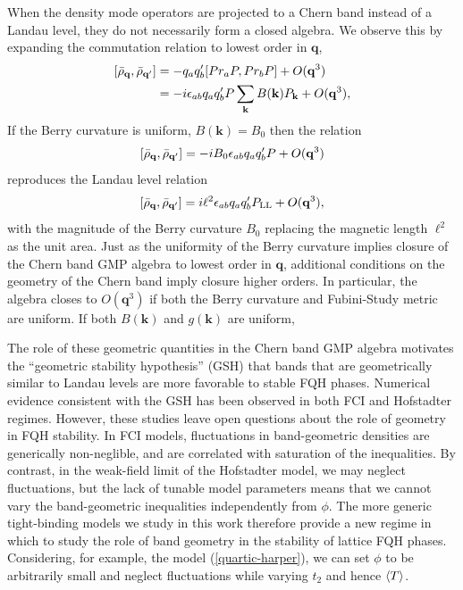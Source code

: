 \documentclass[aps,prb,twocolumn,letterpaper,twoside,nobalancelastpage,groupedaddress,amsmath,amssymb,floatfix,citeautoscript]{revtex4-1}
\begin{document}
When the density mode operators are projected to a Chern band instead of a Landau level, they do not necessarily form a closed algebra\cite{parameswaran_fractional_2012}. We observe this by expanding the commutation relation to lowest order in $\mathbf{q}$,
\begin{align*}
\comm{\bar{\rho}_{\mathbf{q}}}{\bar{\rho}_{\mathbf{q}'}} &= -q_a q'_b \comm{Pr_aP}{Pr_bP} + O(\mathbf{q}^3)\\
&= - i \epsilon_{ab} q_a q'_b P \sum_{\mathbf{k}} B(\mathbf{k}) P_\mathbf{k} + O(\mathbf{q}^3),
\end{align*}
If the Berry curvature is uniform, $B(\mathbf{k}) = B_0$ then the relation
\begin{align*}
\comm{\bar{\rho}_{\mathbf{q}}}{\bar{\rho}_{\mathbf{q}'}} = - i B_0\epsilon_{ab} q_a q'_b P + O(\mathbf{q}^3)
\end{align*}
reproduces the Landau level relation
\begin{align*}
\comm{\bar{\rho}_{\mathbf{q}}}{\bar{\rho}_{\mathbf{q}'}} = i \ell^2 \epsilon_{ab} q_a q'_b P_{\text{LL}} + O(\mathbf{q}^3),
\end{align*}
with the magnitude of the Berry curvature $B_0$ replacing the magnetic length $\ell^2$ as the unit area. Just as the uniformity of the Berry curvature implies closure of the Chern band GMP algebra to lowest order in $\mathbf{q}$, additional conditions on the geometry of the Chern band imply closure higher orders. In particular, the algebra closes to $O(\mathbf{q}^3)$ if both the Berry curvature and Fubini-Study metric are uniform.\cite{roy_band_2014} If both $B(\mathbf{k})$ and $g(\mathbf{k})$ are uniform, 

The role of these geometric quantities in the Chern band GMP algebra motivates the ``geometric stability hypothesis'' (GSH)\cite{roy_band_2014,jackson_geometric_2015} that bands that are geometrically similar to Landau levels are more favorable to stable FQH phases. Numerical evidence consistent with the GSH has been observed in both FCI \cite{jackson_geometric_2015} and Hofstadter regimes\cite{bauer_quantum_2016}. However, these studies leave open questions about the role of geometry in FQH stability. In FCI models, fluctuations in band-geometric densities are generically non-neglible, and are correlated with saturation of the inequalities. By contrast, in the weak-field limit of the Hofstadter model, we may neglect fluctuations, but the lack of tunable model parameters means that we cannot vary the band-geometric inequalities independently from $\phi$. The more generic tight-binding models we study in this work therefore provide a new regime in which to study the role of band geometry in the stability of lattice FQH phases. Considering, for example, the model (\ref{quartic-harper}), we can set $\phi$ to be arbitrarily small and neglect fluctuations while varying $t_2$ and hence $\expval{T}$.
\end{document}
